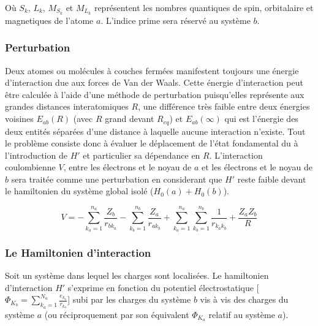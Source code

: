 Où $S_{k}$, $L_{k}$, $M_{S_{k}}$ et $M_{L_{k}}$ représentent les nombres quantiques de spin, orbitalaire et magnetiques de l'atome $a$. L'indice prime sera réservé au système $b$.

\subsubsection{Perturbation}

Deux atomes ou molécules à couches fermées manifestent toujours une énergie d'interaction due aux forces de Van der Waals. Cette énergie d'interaction peut être calculée à l'aide d'une méthode de perturbation puisqu'elles représente aux grandes distances interatomiques $R$, une différence très faible entre deux énergies voisines $E_{ab}(R)$ (avec $R$ grand devant $R_{eq}$) et $E_{ab}(\infty)$ qui est l'énergie des deux entités séparées d'une distance à laquelle aucune interaction n'existe.
Tout le problème consiste donc à évaluer le déplacement de l'état fondamental du à l'introduction de $H'$ et particulier sa dépendance en $R$. L'interaction coulombienne $V$, entre les électrons et le noyau de $a$ et les électrons et le noyau de $b$ sera traitée comme une perturbation en considerant que $H'$ reste faible devant le hamiltonien du système global isolé ($H_{0}(a)+ H_{0}(b)$). 
	
\begin{equation}
V = - \sum_{k_{a}=1}^{n_{a}} \frac{Z_{b}}{r_{bk_{a}}} - \sum_{k_{b}=1}^{n_{b}} \frac{Z_{a}}{r_{ak_{b}}} + \sum_{k_{a}=1}^{n_{a}} \sum_{k_{b}=1}^{n_{b}} \frac{1}{r_{k_{a}k_{b}}} + \frac{Z_{a} Z_{b}}{R}
\end{equation}

\subsubsection{Le Hamiltonien d'interaction}

Soit un système dans lequel les charges sont localisées. Le hamiltonien d'interaction $H'$ s'exprime en fonction du potentiel électrostatique [$\Phi_{K_{b}}= \sum_{k_{a}=1}^{N_{a}} \frac{e_{k_{a}}}{r_{k_{a}}}$] subi par les charges du système $b$ vis à vis des charges du système $a$ (ou réciproquement par son équivalent $\Phi_{K_{a}}$ relatif au système $a$).
	

